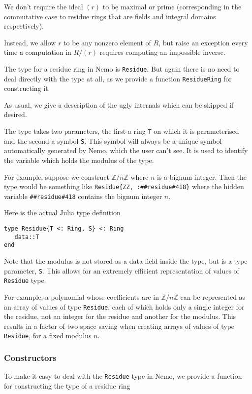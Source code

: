 \documentclass[a4paper,10pt]{article}
\newcommand{\Z}{\mathbb{Z}}
\newcommand{\code}{\lstinline}
\begin{document}
{{{We don't require the ideal $(r)$ to be maximal or prime (corresponding in the
commutative case to residue rings that are fields and integral domains 
respectively). 

Instead, we allow $r$ to be any nonzero element of $R$, but raise an exception
every time a computation in $R/(r)$ requires computing an impossible inverse.

The type for a residue ring in Nemo is \code{Residue}. But again there is no
need to deal directly with the type at all, as we provide a function
\code{ResidueRing} for constructing it.

As usual, we give a description of the ugly internals which can be skipped if
desired.

The type takes two parameters, the first a ring \code{T} on which it is
parameterised and the second a symbol \code{S}. This symbol will always be
a unique symbol automatically generated by Nemo, which the user can't see. It
is used to identify the variable which holds the modulus of the type.

For example, suppose we construct $\Z/n\Z$ where $n$ is a bignum integer. Then
the type would be something like \code|Residue{ZZ, :##residue#418}| where the
hidden variable \code{##residue#418} contains the bignum integer $n$.

Here is the actual Julia type definition

\begin{lstlisting}
type Residue{T <: Ring, S} <: Ring
   data::T
end
\end{lstlisting}

Note that the modulus is not stored as a data field inside the type, but is
a type parameter, \code{S}. This allows for an extremely efficient 
representation of values of \code{Residue} type.

For example, a polynomial whose coefficients are in $\Z/n\Z$ can be 
represented as an array of values of type \code{Residue}, each of which holds
only a single integer for the residue, not an integer for the residue and
another for the modulus. This results in a factor of two space saving when
creating arrays of values of type \code{Residue}, for a fixed modulus $n$.

\subsubsection{Constructors}

To make it easy to deal with the \code{Residue} type in Nemo, we provide a
function for constructing the type of a residue ring

}}}
\end{document}
